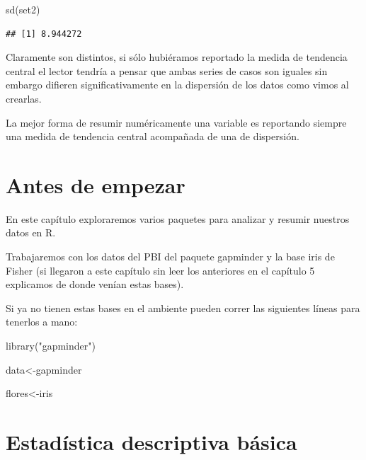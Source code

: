 \documentclass[
]{book}
\newenvironment{Shaded}{\begin{snugshade}}{\end{snugshade}}
\newcommand{\FunctionTok}[1]{\textcolor[rgb]{0.00,0.00,0.00}{#1}}
\newcommand{\NormalTok}[1]{#1}
\newcommand{\OtherTok}[1]{\textcolor[rgb]{0.56,0.35,0.01}{#1}}
\newcommand{\StringTok}[1]{\textcolor[rgb]{0.31,0.60,0.02}{#1}}
\begin{document}
\begin{Shaded}
\begin{Highlighting}[]
\FunctionTok{sd}\NormalTok{(set2)}
\end{Highlighting}
\end{Shaded}

\begin{verbatim}
## [1] 8.944272
\end{verbatim}

Claramente son distintos, si sólo hubiéramos reportado la medida de tendencia central el lector tendría a pensar que ambas series de casos son iguales sin embargo difieren significativamente en la dispersión de los datos como vimos al crearlas.

La mejor forma de resumir numéricamente una variable es reportando siempre una medida de tendencia central acompañada de una de dispersión.

\hypertarget{antes-de-empezar-1}{%
\section{Antes de empezar}\label{antes-de-empezar-1}}

En este capítulo exploraremos varios paquetes para analizar y resumir nuestros datos en R.

Trabajaremos con los datos del PBI del paquete gapminder y la base iris de Fisher (si llegaron a este capítulo sin leer los anteriores en el capítulo 5 explicamos de donde venían estas bases).

Si ya no tienen estas bases en el ambiente pueden correr las siguientes líneas para tenerlos a mano:

\begin{Shaded}
\begin{Highlighting}[]
\FunctionTok{library}\NormalTok{(}\StringTok{"gapminder"}\NormalTok{)}

\NormalTok{data}\OtherTok{\textless{}{-}}\NormalTok{gapminder}

\NormalTok{flores}\OtherTok{\textless{}{-}}\NormalTok{iris}
\end{Highlighting}
\end{Shaded}

\hypertarget{estaduxedstica-descriptiva-buxe1sica}{%
\section{Estadística descriptiva básica}\label{estaduxedstica-descriptiva-buxe1sica}}
\end{document}
